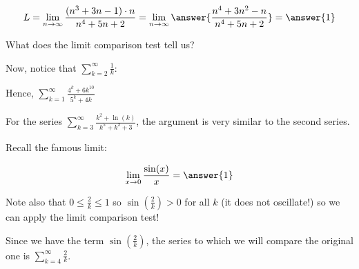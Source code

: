 \documentclass{ximera}
\begin{document}
\begin{exercise}
\begin{hint}
\begin{question}
\begin{question}
\[
L =  \lim_{n \to \infty} \frac{(n^3+3n-1)\cdot n}{n^4+5n+2}  =  \lim_{n \to \infty} \answer{\frac{n^4+3n^2-n}{n^4+5n+2}} =\answer{1}
\]


What does the limit comparison test tell us?

\begin{multipleChoice}
\end{multipleChoice}

Now, notice that $\sum_{k=2}^{\infty} \frac{1}{k}$:
\begin{multipleChoice}
\end{multipleChoice}

Hence, $\sum_{k=1}^{\infty} \frac{4^k+6k^{10}}{5^k+4k}$
\begin{multipleChoice}
\end{multipleChoice}

\end{question}
\end{question}


\begin{question}
For the series $\sum_{k=3}^{\infty} \frac{k^2+\ln(k)}{k^5+k^2+3}$, the argument is very similar to the second series.
\end{question}


\begin{hint}
Recall the famous limit:

\[
\lim_{x \to 0} \frac{\sin(x)}{x} = \answer{1}
\]

Note also that $0 \leq \frac{2}{k} \leq 1$ so $\sin\left(\frac{2}{k}\right) >0$ for all $k$ (it does not oscillate!) so we can apply the limit comparison test!

Since we have the term $\sin\left(\frac{2}{k}\right)$, the series to which we will compare the original one is $\sum_{k=4}^{\infty}\frac{2}{k}$. 
\end{hint}

\end{hint}
\end{exercise}
\end{document}

